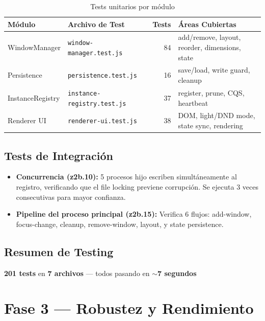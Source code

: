 \documentclass[12pt,a4paper]{article}
\begin{document}
\begin{table}[H]
\centering
\renewcommand{\arraystretch}{1.3}
\begin{tabularx}{\textwidth}{l l r X}
\toprule
\textbf{M\'odulo} & \textbf{Archivo de Test} & \textbf{Tests} & \textbf{\'Areas Cubiertas} \\
\midrule
WindowManager & \texttt{window-manager.test.js} & 84 & add/remove, layout, reorder, dimensions, state \\
Persistence & \texttt{persistence.test.js} & 16 & save/load, write guard, cleanup \\
InstanceRegistry & \texttt{instance-registry.test.js} & 37 & register, prune, CQS, heartbeat \\
Renderer UI & \texttt{renderer-ui.test.js} & 38 & DOM, light/DND mode, state sync, rendering \\
\bottomrule
\end{tabularx}
\caption{Tests unitarios por m\'odulo}
\end{table}

\subsection{Tests de Integraci\'on}

\begin{itemize}
    \item \textbf{Concurrencia (z2b.10):} 5 procesos hijo escriben simult\'aneamente al registro, verificando que el file locking previene corrupci\'on. Se ejecuta 3 veces consecutivas para mayor confianza.
    \item \textbf{Pipeline del proceso principal (z2b.15):} Verifica 6 flujos: add-window, focus-change, cleanup, remove-window, layout, y state persistence.
\end{itemize}

\subsection{Resumen de Testing}

\begin{infobox}
\textbf{201 tests} en \textbf{7 archivos} --- todos pasando en \textbf{$\sim$7 segundos}
\end{infobox}

\section{Fase 3 --- Robustez y Rendimiento}
\end{document}
